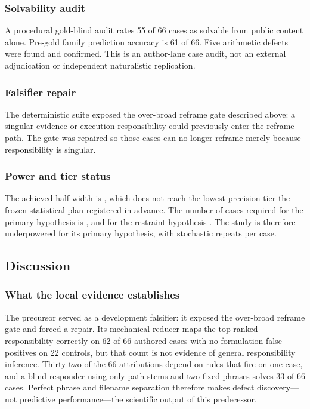 \subsubsection{Solvability audit}
A procedural gold-blind audit rates 55 of 66 cases as solvable from public
content alone. Pre-gold family prediction accuracy is 61 of 66. Five arithmetic
defects were found and confirmed. This is an author-lane case audit, not an
external adjudication or independent naturalistic replication.

\subsubsection{Falsifier repair}
The deterministic suite exposed the over-broad reframe gate described above: a
singular evidence or execution responsibility could previously enter the reframe
path. The gate was repaired so those cases can no longer reframe merely because
responsibility is singular.

\subsubsection{Power and tier status}
The achieved half-width is \AchievedHalfWidth{}, which does not reach the
lowest precision tier the frozen statistical plan registered in advance. The
number of cases required for the primary hypothesis is \RequiredNForHOne{}, and
for the restraint hypothesis \RequiredNForHTwo{}. The study is therefore
underpowered for its primary hypothesis, with \StochasticRepeats{} stochastic
repeats per case.

\subsection{Discussion}

\subsubsection{What the local evidence establishes}
The precursor served as a development falsifier: it exposed the over-broad
reframe gate and forced a repair. Its mechanical reducer maps the top-ranked
responsibility correctly on 62 of 66 authored cases with no formulation false
positives on 22 controls, but that count is not evidence of general
responsibility inference. Thirty-two of the 66 attributions depend on rules
that fire on one case, and a blind responder using only path stems and two fixed
phrases solves 33 of 66 cases. Perfect phrase and filename separation therefore
makes defect discovery---not predictive performance---the scientific output of
this predecessor.

